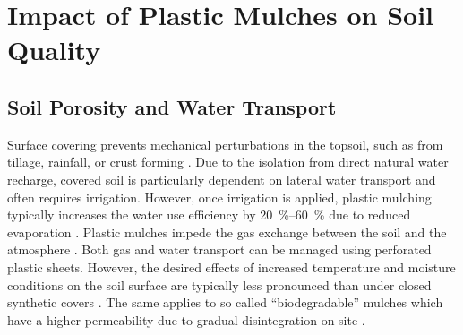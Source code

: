\section{Impact of Plastic Mulches on Soil Quality}
\label{sec:plastic-mulching:soil-quality}

\subsection{Soil Porosity and Water Transport}

Surface covering prevents mechanical perturbations in the topsoil, such as from tillage, rainfall, or crust forming \citep{KhanSoil2000,SubrahmaniyanCrop2006}. Due to the isolation from direct natural water recharge, covered soil is particularly dependent on lateral water transport \citep{LiOpenHole2003} and often requires irrigation. However, once
irrigation is applied, plastic mulching typically increases the water use efficiency by \SIrange{20}{60}{\percent} due to reduced evaporation \citep{QinSoil2015,ZribiEfficiency2015}. Plastic mulches impede the gas exchange between the soil and the atmosphere \citep{KhanSoil2000}. Both gas and water transport can be managed using perforated plastic sheets.
However, the desired effects of increased temperature and moisture conditions on the soil surface are typically less pronounced than under closed synthetic covers \citep{LiOpenHole2003}. The same applies to so called ``biodegradable'' mulches which have a higher permeability due to gradual disintegration on site \citep{MorenoEffect2008}.

